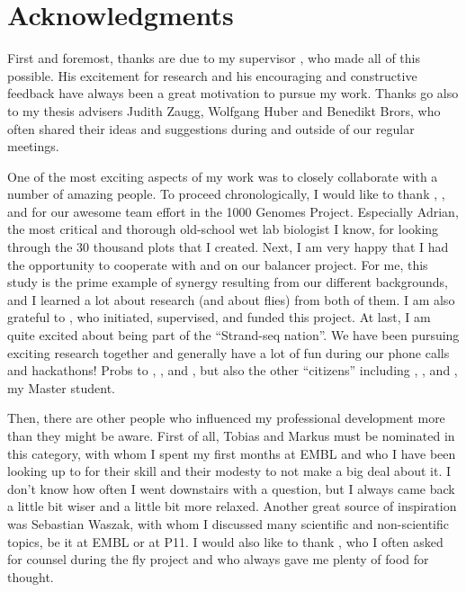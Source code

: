 \cleardoublepage
{}
\chapter*{Acknowledgments}


First and foremost, thanks are due to my supervisor \jan, who made all of this
possible. His excitement for research and his encouraging and constructive
feedback have always been a great motivation to pursue my work. Thanks go also
to my thesis advisers Judith Zaugg, Wolfgang Huber and Benedikt Brors, who often
shared their ideas and suggestions during and outside of our regular meetings.

One of the most exciting aspects of my work was to closely collaborate with a
number of amazing people. To proceed chronologically, I would like to thank
\tobias, \markus, \andreas and \adrian for our awesome team effort in the
1000 Genomes Project. Especially Adrian, the most critical and thorough
old-school wet lab biologist I know, for looking through the 30 thousand plots
that I created. Next, I am very happy that I had the opportunity to cooperate with \yad and \alek
on our balancer project. For me, this study is the prime example of synergy
resulting from our different backgrounds, and I learned a lot about research
(and about flies) from both of them. I am also grateful to \eileen, who
initiated, supervised, and funded this project. At last, I am quite excited
about being part of the ``Strand-seq nation''. We have been pursuing exciting
research together and generally have a lot of fun during our phone calls and
hackathons! Probs to \ashley, \marschall, \david and \maryam, but also the
other ``citizens'' including \karen, \hyobin, and \venla, my Master student.

Then, there are other people who influenced my professional development more
than they might be aware. First of all, Tobias and Markus must be nominated in
this category, with whom I spent my first months at EMBL and who I have been
looking up to for their skill and their modesty to not make a big deal about it.
I don't know how often I went downstairs with a question, but I always came back
a little bit wiser and a little bit more relaxed. Another great source of
inspiration was Sebastian Waszak, with whom I discussed many scientific and
non-scientific topics, be it at EMBL or at P11. I would also like to thank
\garfield, who I often asked for counsel during the fly project and who always
gave me plenty of food for thought.


